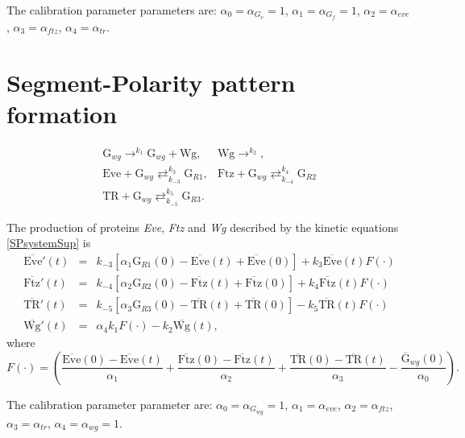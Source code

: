 \documentclass[final,authoryear, 5p, times]{elsarticle}
\begin{document}
The calibration parameter parameters are: $\alpha_0=\alpha_{G_e}=1$, $\alpha_1=\alpha_{G_f}=1$, $\alpha_2=\alpha_{eve}$, $\alpha_3=\alpha_{ftz}$, $\alpha_4=\alpha_{tr}$. 

\section{Segment-Polarity pattern formation}\label{AppC}

\begin{equation}\label{SPsystemSup}
    \begin{array}{ll}
        \displaystyle
        \text{G}_{wg} \mathop{\longrightarrow}^{k_{1}} \text{G}_{wg} + \text{Wg}, & \displaystyle
        \text{Wg} \mathop{\longrightarrow}^{k_{2}}, \\ \displaystyle
        \text{Eve} +  \text{G}_{wg} \mathop{\rightleftarrows}^{k_{3}}_{k_{-3}}  \text{G}_{R1},& \displaystyle
         \text{Ftz} +  \text{G}_{wg} \mathop{\rightleftarrows}^{k_{4}}_{k_{-4}}  \text{G}_{R2} \\ \displaystyle
        \text{TR} +  \text{G}_{wg} \mathop{\rightleftarrows}^{k_{5}}_{k_{-5}}  \text{G}_{R3}. &
    \end{array}
\end{equation}

The production of proteins \textit{Eve},  \textit{Ftz}  and \textit{Wg} described by the kinetic equations \eqref{SPsystemSup} is
$$
\begin{array}{lcl}
    \overline{\text{Eve}}'(t) &=& k_{-3}   \left[\alpha_1 \text{G}_{R1}(0)-\overline{\text{Eve}}(t)+\overline{\text{Eve}}(0)\right]  
 + k_3 \overline{\text{Eve}}(t) F(\cdot)\\[5pt] \displaystyle
    \overline{\text{Ftz}}'(t)&=& k_{-4}   \left[\alpha_2 \text{G}_{R2}(0)-\overline{\text{Ftz}}(t)+\overline{\text{Ftz}}(0)\right]  
    +k_4 \overline{\text{Ftz}}(t) F(\cdot)\\[5pt] \displaystyle
    \overline{\text{TR}}'(t)&=&  k_{-5}   \left[\alpha_3 \text{G}_{R3}(0)-\overline{\text{TR}}(t)+\overline{\text{TR}}(0)\right] - k_{5} \overline{\text{TR}}(t) F(\cdot)\\[5pt] \displaystyle
    \overline{\text{Wg}}'(t)&=&\alpha_4 k_1 F(\cdot)-k_2 \overline{\text{Wg}}(t), 
\end{array}
$$
where
$$
F(\cdot)= \left(\frac{\overline{\text{Eve}}(0)-\overline{\text{Eve}}(t)}{\alpha_1}+\frac{\overline{\text{Ftz}}(0)-\overline{\text{Ftz}}(t)}{\alpha_2} +\frac{\overline{\text{TR}}(0)-\overline{\text{TR}}(t)}{\alpha_3} -\frac{\overline{\text{G}}_{wg}(0)}{\alpha_0}\right).
$$

The calibration parameter parameter are: $\alpha_0=\alpha_{G_{wg}}=1$, $\alpha_1=\alpha_{eve}$, $\alpha_2=\alpha_{ftz}$, $\alpha_3=\alpha_{tr}$, $\alpha_4=\alpha_{wg}=1$. 
\end{document}
